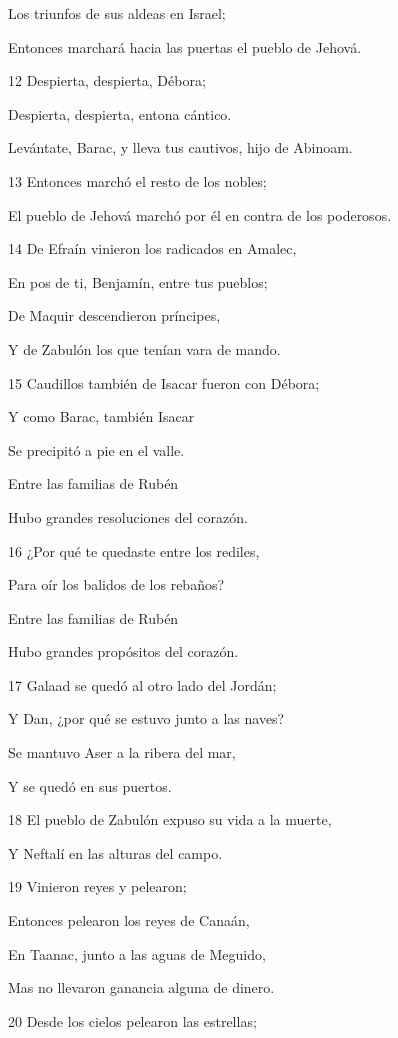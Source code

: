 \par Los triunfos de sus aldeas en Israel;
\par Entonces marchará hacia las puertas el pueblo de Jehová.
\par 12 Despierta, despierta, Débora;
\par Despierta, despierta, entona cántico.
\par Levántate, Barac, y lleva tus cautivos, hijo de Abinoam.
\par 13 Entonces marchó el resto de los nobles;
\par El pueblo de Jehová marchó por él en contra de los poderosos.
\par 14 De Efraín vinieron los radicados en Amalec,
\par En pos de ti, Benjamín, entre tus pueblos;
\par De Maquir descendieron príncipes,
\par Y de Zabulón los que tenían vara de mando.
\par 15 Caudillos también de Isacar fueron con Débora;
\par Y como Barac, también Isacar
\par Se precipitó a pie en el valle.
\par Entre las familias de Rubén
\par Hubo grandes resoluciones del corazón.
\par 16 ¿Por qué te quedaste entre los rediles,
\par Para oír los balidos de los rebaños?
\par Entre las familias de Rubén
\par Hubo grandes propósitos del corazón. 
\par 17 Galaad se quedó al otro lado del Jordán;
\par Y Dan, ¿por qué se estuvo junto a las naves?
\par Se mantuvo Aser a la ribera del mar,
\par Y se quedó en sus puertos.
\par 18 El pueblo de Zabulón expuso su vida a la muerte,
\par Y Neftalí en las alturas del campo.
\par 19 Vinieron reyes y pelearon;
\par Entonces pelearon los reyes de Canaán,
\par En Taanac, junto a las aguas de Meguido,
\par Mas no llevaron ganancia alguna de dinero.
\par 20 Desde los cielos pelearon las estrellas;
